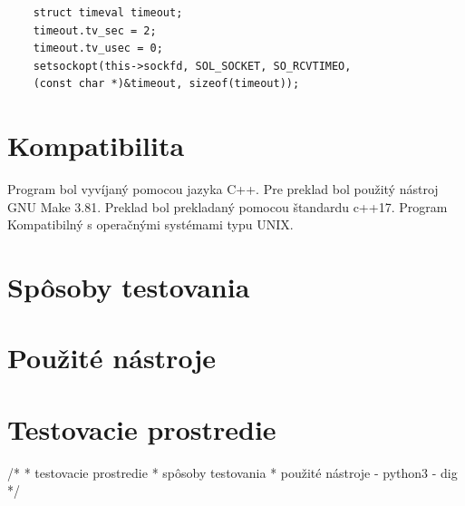 \begin{verbatim}
    struct timeval timeout;
    timeout.tv_sec = 2;
    timeout.tv_usec = 0;
    setsockopt(this->sockfd, SOL_SOCKET, SO_RCVTIMEO, 
    (const char *)&timeout, sizeof(timeout));
\end{verbatim}

\section{Kompatibilita}
\label{Kompatibilita}
Program bol vyvíjaný pomocou jazyka C++. Pre preklad bol použitý nástroj GNU Make 3.81. Preklad bol prekladaný pomocou štandardu c++17.
Program Kompatibilný s operačnými systémami typu UNIX. 


\section{Spôsoby testovania}
\label{Spôsoby testovania}

\section{Použité nástroje}
\label{Použité nástroje}

\section{Testovacie prostredie}
\label{Testovacaie prostrede}

/*
 * testovacie prostredie
 * spôsoby testovania
 * použité nástroje - python3
                    - dig 
 */



